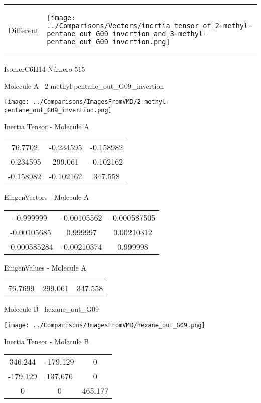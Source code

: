 \vtab[-5mm]
\begin{tabular}{*{2}{m{}}}
\begin{center}
\textcolor{NavyBlue}{\Large Different}
\end{center}
&
\begin{center}
\texttt{[image: ../Comparisons/Vectors/inertia\_tensor\_of\_2-methyl-pentane\_out\_G09\_invertion\_and\_3-methyl-pentane\_out\_G09\_invertion.png]}
\end{center}
\end{tabular}

 \newpage

\vtab[-3cm]
\begin{center}
{\large IsomerC6H14 \tab Número 515}
\end{center}
\begin{multicols}{2}
\begin{center}

Molecule A \
2-methyl-pentane\_out\_G09\_invertion

\texttt{[image: ../Comparisons/ImagesFromVMD/2-methyl-pentane\_out\_G09\_invertion.png]}

Inertia Tensor - Molecule A \\
\begin{tabular}{|c c c|}
76.7702	 & 	-0.234595	 & 	-0.158982	 \\
-0.234595	 & 	299.061	 & 	-0.102162	 \\
-0.158982	 & 	-0.102162	 & 	347.558
\end{tabular}

\vtab
 EingenVectors - Molecule A     \\
\begin{tabular}{|c c c|}
-0.999999	 & 	-0.00105562	 & 	-0.000587505	 \\
-0.00105685	 & 	0.999997	 & 	0.00210312	 \\
-0.000585284	 & 	-0.00210374	 & 	0.999998
\end{tabular}

\vtab
 EingenValues - Molecule A     \\
\begin{tabular}{|c c c|}
76.7699	 & 	299.061	 & 	347.558	 \\
\end{tabular}
\columnbreak

Molecule B \
hexane\_out\_G09

\texttt{[image: ../Comparisons/ImagesFromVMD/hexane\_out\_G09.png]}

Inertia Tensor - Molecule B \\
\begin{tabular}{|c c c|}
346.244	 & 	-179.129	 & 	0	 \\
-179.129	 & 	137.676	 & 	0	 \\
0	 & 	0	 & 	465.177
\end{tabular}


\end{center}
\end{multicols}
